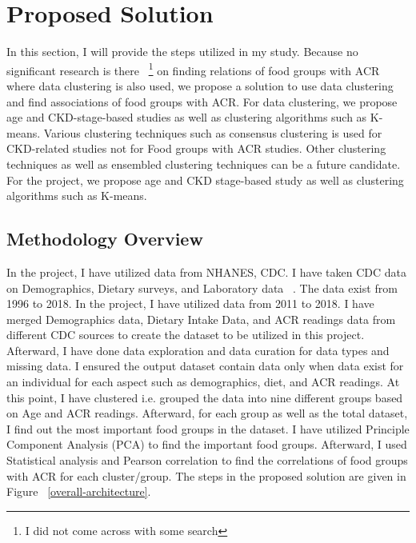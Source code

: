 \section{Proposed Solution}
In this section, I will provide the steps utilized in my study. Because no significant research is there ~\footnote{I did not come across with some search} on finding relations of food groups with ACR where data clustering is also used, we propose a solution to use data clustering and find associations of food groups with ACR. For data clustering, we propose age and CKD-stage-based studies as well as clustering algorithms such as K-means. Various clustering techniques such as consensus clustering is used for CKD-related studies not for Food groups with ACR studies. Other clustering techniques as well as ensembled clustering techniques can be a future candidate. For the project, we propose age and CKD stage-based study as well as clustering algorithms such as K-means.

\subsection{Methodology Overview}
\flushleft \justifying In the project, I have utilized data from NHANES, CDC. I have taken CDC data on Demographics, Dietary surveys, and Laboratory data ~\cite{CDCDataset}. The data exist from 1996 to 2018. In the project, I have utilized data from 2011 to 2018. I have merged Demographics data, Dietary Intake Data, and ACR readings data from different CDC sources to create the dataset to be utilized in this project. Afterward, I have done data exploration and data curation for data types and missing data. I ensured the output dataset contain data only when data exist for an individual for each aspect such as demographics, diet, and ACR readings. At this point, I have clustered i.e. grouped the data into nine different groups based on Age and ACR readings. Afterward, for each group as well as the total dataset, I find out the most important food groups in the dataset. I have utilized Principle Component Analysis (PCA) to find the important food groups. Afterward, I used Statistical analysis and Pearson correlation to find the correlations of food groups with ACR for each cluster/group. The steps in the proposed solution are given in Figure ~\ref{overall-architecture}.

